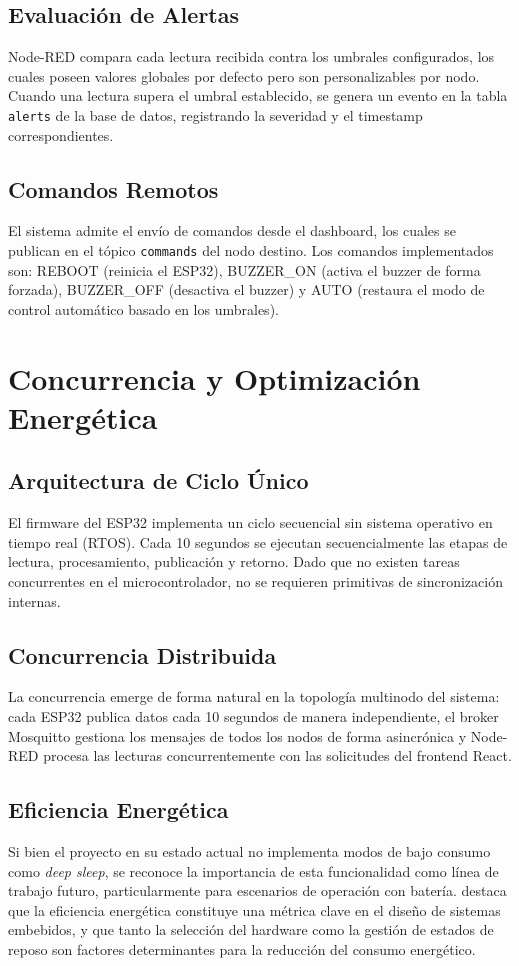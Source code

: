 \documentclass[11pt,a4paper]{article}
\begin{document}
\subsection{Evaluaci\'on de Alertas}
Node-RED compara cada lectura recibida contra los umbrales configurados, los cuales poseen valores globales por defecto pero son personalizables por nodo. Cuando una lectura supera el umbral establecido, se genera un evento en la tabla \texttt{alerts} de la base de datos, registrando la severidad y el timestamp correspondientes.

\subsection{Comandos Remotos}
El sistema admite el env\'io de comandos desde el dashboard, los cuales se publican en el t\'opico \texttt{commands} del nodo destino. Los comandos implementados son: REBOOT (reinicia el ESP32), BUZZER\_ON (activa el buzzer de forma forzada), BUZZER\_OFF (desactiva el buzzer) y AUTO (restaura el modo de control autom\'atico basado en los umbrales).

\section{Concurrencia y Optimizaci\'on Energ\'etica}

\subsection{Arquitectura de Ciclo \'Unico}
El firmware del ESP32 implementa un ciclo secuencial sin sistema operativo en tiempo real (RTOS). Cada 10 segundos se ejecutan secuencialmente las etapas de lectura, procesamiento, publicaci\'on y retorno. Dado que no existen tareas concurrentes en el microcontrolador, no se requieren primitivas de sincronizaci\'on internas.

\subsection{Concurrencia Distribuida}
La concurrencia emerge de forma natural en la topolog\'ia multinodo del sistema: cada ESP32 publica datos cada 10 segundos de manera independiente, el broker Mosquitto gestiona los mensajes de todos los nodos de forma asincr\'onica y Node-RED procesa las lecturas concurrentemente con las solicitudes del frontend React.

\subsection{Eficiencia Energ\'etica}
Si bien el proyecto en su estado actual no implementa modos de bajo consumo como \textit{deep sleep}, se reconoce la importancia de esta funcionalidad como l\'inea de trabajo futuro, particularmente para escenarios de operaci\'on con bater\'ia. \citet{cayssials2014} destaca que la eficiencia energ\'etica constituye una m\'etrica clave en el dise\~no de sistemas embebidos, y que tanto la selecci\'on del hardware como la gesti\'on de estados de reposo son factores determinantes para la reducci\'on del consumo energ\'etico.
\end{document}
